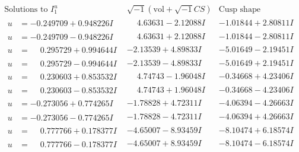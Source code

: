 \documentclass[1p]{elsarticle_modified}
\theoremstyle{definition}
\newcommand{\I}{\sqrt{-1}}
\begin{document}
$$\begin{array}{c|c|c}  
\text{Solutions to }I^u_{1}& \I (\text{vol} + \sqrt{-1}CS) & \text{Cusp shape}\\
 \hline 
\begin{aligned}
u &= -0.249709 + 0.948226 I\end{aligned}
 & \phantom{-}4.63631 - 2.12088 I & -1.01844 + 2.80811 I \\ \hline\begin{aligned}
u &= -0.249709 - 0.948226 I\end{aligned}
 & \phantom{-}4.63631 + 2.12088 I & -1.01844 - 2.80811 I \\ \hline\begin{aligned}
u &= \phantom{-}0.295729 + 0.994644 I\end{aligned}
 & -2.13539 + 4.89833 I & -5.01649 - 2.19451 I \\ \hline\begin{aligned}
u &= \phantom{-}0.295729 - 0.994644 I\end{aligned}
 & -2.13539 - 4.89833 I & -5.01649 + 2.19451 I \\ \hline\begin{aligned}
u &= \phantom{-}0.230603 + 0.853532 I\end{aligned}
 & \phantom{-}4.74743 - 1.96048 I & -0.34668 + 4.23406 I \\ \hline\begin{aligned}
u &= \phantom{-}0.230603 - 0.853532 I\end{aligned}
 & \phantom{-}4.74743 + 1.96048 I & -0.34668 - 4.23406 I \\ \hline\begin{aligned}
u &= -0.273056 + 0.774265 I\end{aligned}
 & -1.78828 + 4.72311 I & -4.06394 - 4.26663 I \\ \hline\begin{aligned}
u &= -0.273056 - 0.774265 I\end{aligned}
 & -1.78828 - 4.72311 I & -4.06394 + 4.26663 I \\ \hline\begin{aligned}
u &= \phantom{-}0.777766 + 0.178377 I\end{aligned}
 & -4.65007 - 8.93459 I & -8.10474 + 6.18574 I \\ \hline\begin{aligned}
u &= \phantom{-}0.777766 - 0.178377 I\end{aligned}
 & -4.65007 + 8.93459 I & -8.10474 - 6.18574 I \\ \hline\begin{aligned}

\end{aligned}
\end{array}$$
\end{document}
